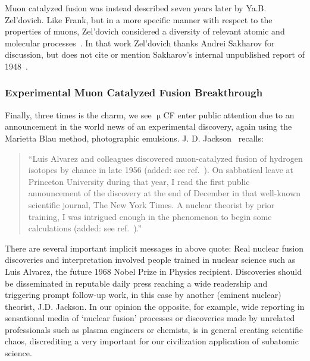 \documentclass[particles,article,accept,pdftex,moreauthors]{Definitions/mdpi}
\begin{document}
Muon catalyzed fusion was instead described seven years later by Ya.B. Zel'dovich. Like Frank, but in a more specific manner with respect to the properties of muons, Zel'dovich considered a diversity of relevant atomic and molecular processes~\cite{Zel:1954}. In that work Zel'dovich thanks Andrei Sakharov for discussion, but does not cite or mention Sakharov's internal unpublished report of 1948~\cite{Sakharov:1989P}.

\subsubsection{Experimental Muon Catalyzed Fusion Breakthrough}\label{ssec:muCFexp}
Finally, three times is the charm, we see $\upmu$CF enter public attention due to an announcement in the world news of an experimental discovery, again using the Marietta Blau method, photographic emulsions. J. D. Jackson~\cite{Jackson:2010Rem} recalls:
\begin{quote}
``Luis Alvarez and colleagues discovered muon-catalyzed fusion of hydrogen isotopes by chance in late 1956 (added: see ref.~\cite{Alvarez:1957un}). On sabbatical leave at Princeton University during that year, I read the first public announcement of the discovery at the end of December in that well-known scientific journal, The New York Times. A nuclear theorist by prior training, I was intrigued enough in the phenomenon to begin some calculations (added: see ref.~\cite{Jackson:2010Rem}).''
\end{quote}

There are several important implicit messages in above quote: Real nuclear fusion discoveries and interpretation involved people trained in nuclear science such as Luis Alvarez, the future 1968 Nobel Prize in Physics recipient. Discoveries should be disseminated in reputable daily press reaching a wide readership and triggering prompt follow-up work, in this case by another (eminent nuclear) theorist, J.D. Jackson. In our opinion the opposite, for example, wide reporting in sensational media of `nuclear fusion' processes or discoveries made by unrelated professionals such as plasma engineers or chemists, is in general creating scientific chaos, discrediting a very important for our civilization application of subatomic science.
\end{document}
